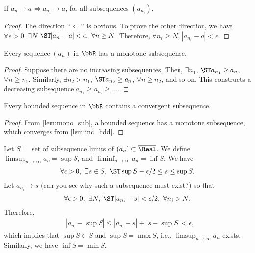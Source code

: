 \documentclass[../aipt.tex]{subfiles}
\begin{document}
\begin{Lemma}\label{wk1:subseq}
If $a_n \to a \iff a_{n_i} \to a$, for all subsequences $(a_{n_i})$.
\end{Lemma}
\begin{proof}
The direction ``$\Leftarrow$'' is obvious. To prove the other direction, we have $\forall \epsilon > 0$, $\exists N$ $\ST |a_n - a| < \epsilon,\ \forall n \geq N$. Therefore, $\forall n_i \geq N$, $|a_{n_i} - a| < \epsilon$.
\end{proof}

\begin{Lemma}\label{lem:mono_sub} 
Every sequence $(a_n)$ in $\bbR$ has a monotone subsequence.
\end{Lemma}
\begin{proof}
Suppose there are no increasing subsequences. Then, $\exists n_1$, $\ST a_{n_1} \geq a_n$, $\forall n \geq n_1$. Similarly, $\exists n_2 > n_1$, $\ST a_{n_2} \geq a_n$, $\forall n \geq n_2$, and so on. This constructs a decreasing subsequence $a_{n_1} \geq a_{n_2} \geq \ldots$. 
\end{proof}

\begin{Lemma}\label{lem:bdd_conv}
Every bounded sequence in $\bbR$ contains a convergent subsequence.
\end{Lemma}
\begin{proof}
From \cref{lem:mono_sub}, a bounded sequence has a monotone subsequence, which converges from \cref{lem:inc_bdd}.
\end{proof}

Let $S =$ set of subsequence limits of $(a_n) \subset \overline{\Real}$. We define $\limsup_{n \to \infty} {a_n}=\sup{S}$, and $\liminf_{n \to \infty}{a_n}=\inf{S}$. We have
\begin{align*}
\forall \epsilon > 0,\ \exists s \in S,\ \ST \sup{S} - \epsilon/2 \leq s \leq \sup{S}.
\end{align*}
Let $a_{n_i} \to s$ (can you see why such a subsequence must exist?) so that
\begin{align*}
\forall \epsilon > 0,\ \exists N,\ \ST |a_{n_i} - s| < \epsilon/2,\ \forall n_i > N.
\end{align*}
Therefore,
\begin{align*}
&|a_{n_i} - \sup{S}| \leq |a_{n_i} - s| + |s - \sup{S}| < \epsilon,
\end{align*}
which implies that $\sup{S} \in S$ and $\sup{S} = \max{S}$, i.e., $\limsup_{n\to\infty} a_n$ exists. Similarly, we have $\inf{S} = \min{S}$.
\end{document}
